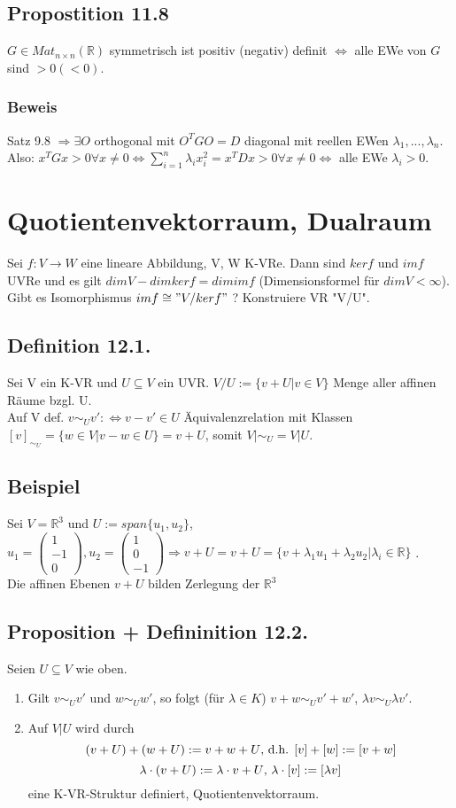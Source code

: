 \documentclass[a4paper, 12pt]{extarticle}
\newcommand{\vecThree}[3] {
	\left( 
	\begin{matrix}
		#1\\
		#2\\
		#3
	\end{matrix} 
	\right)
}
\newcommand{\gdw}{\Leftrightarrow}
\newcommand{\tn}[1]{\textnormal {#1}}
\begin{document}
\subsection*{Propostition 11.8}
$G \in Mat_{n\times n}(\mathbb{R})$ symmetrisch ist positiv (negativ) definit $\Leftrightarrow$ alle EWe von $G$ sind $>0 (<0)$.
\subsubsection*{Beweis}
Satz 9.8 $\Rightarrow \exists O$ orthogonal mit $O^TGO = D$ diagonal mit reellen EWen $\lambda_1,...,\lambda_n$. Also: $x^TGx > 0 \forall x \neq 0 \Leftrightarrow \sum_{i=1}^{n} \lambda_i x_i^2 = x^TDx > 0 \forall x \neq0 \Leftrightarrow$ alle EWe $\lambda_i > 0$.
\section*{Quotientenvektorraum, Dualraum}
Sei $f:V\to W$ eine lineare Abbildung, V, W K-VRe. Dann sind $ker f$ und $im f$ UVRe und es gilt $dimV-dimkerf=dimimf$ (Dimensionsformel für $dimV < \infty$). Gibt es Isomorphismus $im f \cong "V/ kerf"$ ? Konstruiere VR "V/U".
\subsection*{Definition 12.1.}
Sei V ein K-VR und $U\subseteq V$ ein UVR. $V/U := \{v+U | v\in V\}$ Menge aller affinen Räume bzgl. U. \\
Auf V def. $v \sim_U v' :\gdw v-v'\in U$ Äquivalenzrelation mit Klassen $[v]_{\sim_U} = \{w\in V | v-w \in U\} = v+U$, somit $V|\sim_U = V|U$.
\subsection*{Beispiel}
Sei $V = \mathbb R^3$ und $U:= span\{u_1, u_2\}$, $u_1 = \vecThree{1}{-1}{0}, u_2 = \vecThree{1}{0}{-1} \Rightarrow v+U = v+U = \{v+\lambda_1u_1 + \lambda_2u_2 | \lambda_i \in \mathbb R\}$ . \\
Die affinen Ebenen $v + U$ bilden Zerlegung der $\mathbb R^3$
\subsection*{Proposition + Defininition 12.2.}
Seien $U\subseteq V$ wie oben.
\begin{enumerate}[label=\alph*)]
	\item  Gilt $v\sim_U v'$ und $w\sim_U w'$, so folgt (für $\lambda \in K$) $v+w \sim_U v'+w'$, $\lambda v \sim_U \lambda v'$.
	\item Auf $V|U$ wird durch
	$$(v+U) + (w+U) := v+w+U \tn{, d.h. } [v] + [w] := [v+w]$$
	$$\lambda \cdot (v+U) := \lambda \cdot v + U \tn{, } \lambda \cdot [v] := [\lambda v]$$
	eine K-VR-Struktur definiert, Quotientenvektorraum.
\end{enumerate}
\end{document}
